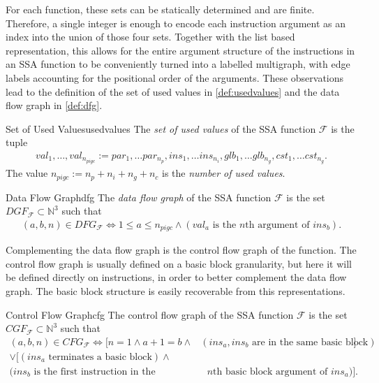     For each function, these sets can be statically determined and are finite.
    Therefore, a single integer is enough to encode each instruction argument as
    an index into the union of those four sets.
    Together with the list based representation, this allows for the
    entire argument structure of the instructions in an SSA function to be
    conveniently turned into a labelled multigraph, with edge labels accounting
    for the positional order of the arguments.
    These observations lead to the definition of the set of used values in
    \autoref{def:usedvalues} and the data flow graph in \autoref{def:dfg}.

\begin{definition}{Set of Used Values}{usedvalues}
    The {\em set of used values} of the SSA function $\mathcal F$ is the tuple
    \begin{align*}
       val_1,\dots,val_{n_{pigc}} := par_1,\dots par_{n_p},
                                     ins_1,\dots ins_{n_i},
                                     glb_1,\dots glb_{n_g},
                                     cst_1,\dots cst_{n_g}.
    \end{align*}
    The value $n_{pigc}:=n_p+n_i+n_g+n_c$ is the {\em number of used values}.
\end{definition}

\begin{definition}{Data Flow Graph}{dfg}
    The {\em data flow graph} of the SSA function $\mathcal F$ is the set
    $DGF_{\mathcal F}\subset \mathbb N^3$ such that
    \begin{align*}
        (a,b,n)\in DFG_{\mathcal F}\iff 1\leq a\leq n_{pigc}\mathrel{\land}(val_a\text{ is the $n$th argument of }ins_b).
    \end{align*}
\end{definition}

    Complementing the data flow graph is the control flow graph of the function.
    The control flow graph is usually defined on a basic block granularity, but
    here it will be defined directly on instructions, in order to better
    complement the data flow graph.
    The basic block structure is easily recoverable from this representations.

\begin{definition}{Control Flow Graph}{cfg}
    The control flow graph of the SSA function $\mathcal F$ is the set
    $CGF_{\mathcal F}\subset \mathbb N^3$ such that
    \begin{align*}
        (a,b,n)\in CFG_{\mathcal F}\iff[n=1\land a+1=b\land&(ins_a,ins_b\text{ are in the same basic block})] \\
                                   \lor[(ins_a\text{ terminates a basic block})\land&\\
                                        (ins_b\text{ is the first instruction in the}&\text{ $n$th basic block argument of }ins_a)].
    \end{align*}
\end{definition}

